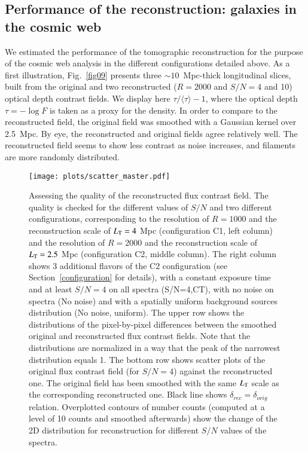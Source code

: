 \documentclass{aa}
\begin{document}
\subsection{Performance of the reconstruction: galaxies in  the cosmic web}
\label{galaxies}

We estimated the performance of the tomographic reconstruction for the purpose of the cosmic web analysis in the different configurations detailed above. 
As a first illustration, Fig.~\ref{fig09} presents three $\sim 10$~Mpc-thick longitudinal slices, built from the original and two reconstructed ($R=2000$ and $S/N=4$ and 10) optical depth contrast fields. We display here $\tau/\langle \tau \rangle -1$, where the optical depth $\tau=-\log F$ is taken as a proxy for the density. In order to  compare to the reconstructed field, the original field was smoothed with a Gaussian kernel over 2.5~Mpc. By eye, the reconstructed and original fields agree relatively well. The reconstructed field seems to show less contrast as noise increases, and filaments are more randomly distributed. 

\begin{figure*}[!t]
\begin{center}
\texttt{[image: plots/scatter\_master.pdf]}
\caption{Assessing the quality of the reconstructed flux contrast field. The quality is checked for the different values of $S/N$ and two different configurations, corresponding to the resolution of $R=1000$ and the reconstruction scale of $L_{\rm T}=4$ Mpc (configuration C1, left column) and the resolution of $R=2000$ and the reconstruction scale of $L_{\rm T}=2.5$ Mpc (configuration C2, middle column). The right column shows 3 additional flavors of the C2 configuration (see Section~\ref{configuration} for details), with a constant exposure time and at least $S/N=4$ on all spectra (S/N=4,CT), with no noise on spectra (No noise) and with a spatially uniform background sources distribution (No noise, uniform). The upper row shows the distributions of the pixel-by-pixel differences between the smoothed original and reconstructed flux contrast fields. Note that the distributions are normalized in a way that the peak of the narrowest distribution equals 1. The bottom row shows scatter plots of the original flux contrast field (for $S/N = 4$) against the reconstructed one. The original field has been smoothed with the same $L_{\rm T}$ scale as the corresponding reconstructed one. Black line shows $\delta_{rec} = \delta_{orig}$ relation. Overplotted contours of number counts (computed at a level of 10 counts and smoothed afterwards) show the change of the 2D distribution for reconstruction for different $S/N$ values of the spectra.}
\label{fig10}
\end{center}
\end{figure*}
\end{document}
